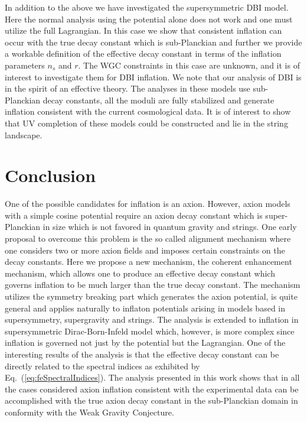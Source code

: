 \documentclass[12pt]{article}
\begin{document}
In addition to the above we have investigated the supersymmetric DBI model.
Here the normal analysis using the potential alone does not work and one must utilize the full Lagrangian.
In this case we show that consistent inflation can occur with the true decay constant which is sub-Planckian and further we provide a workable definition of the effective decay constant in terms of the inflation parameters $n_s$ and $r$.
The WGC constraints in this case are unknown, and it is of interest to investigate them for DBI inflation.
We note that our analysis of DBI is in the spirit of an effective theory.
The analyses in these models use sub-Planckian decay constants, all the moduli are fully stabilized and generate inflation consistent with the current cosmological data.
It is of interest to show that UV completion of these models could be constructed and lie in the string landscape.

\section{Conclusion \label{sec:Conclusion}}
One of the possible candidates for inflation is an axion.
However, axion models with a simple cosine potential require an axion decay constant which is super-Planckian in size which is not favored in quantum gravity and strings.
One early proposal to overcome this problem is the so called alignment mechanism where one considers two or more axion fields and imposes certain constraints on the decay constants.
Here we propose a new mechanism, the coherent enhancement mechanism, which allows one to produce an effective decay constant which governs inflation to be much larger than the true decay constant.
The mechanism utilizes the symmetry breaking part which generates the axion potential, is quite general and applies naturally to inflaton potentials arising in models based in supersymmetry, supergravity and strings.
The analysis is extended to inflation in supersymmetric Dirac-Born-Infeld model which, however, is more complex since inflation is governed not just by the potential but the Lagrangian.
One of the interesting results of the analysis is that the effective decay constant can be directly related to the spectral indices as exhibited by Eq.~(\ref{eq:feSpectralIndices}).
The analysis presented in this work shows that in all the cases considered axion inflation consistent with the experimental data can be accomplished with the true axion decay constant in the sub-Planckian domain in conformity with the Weak Gravity Conjecture.
\end{document}
